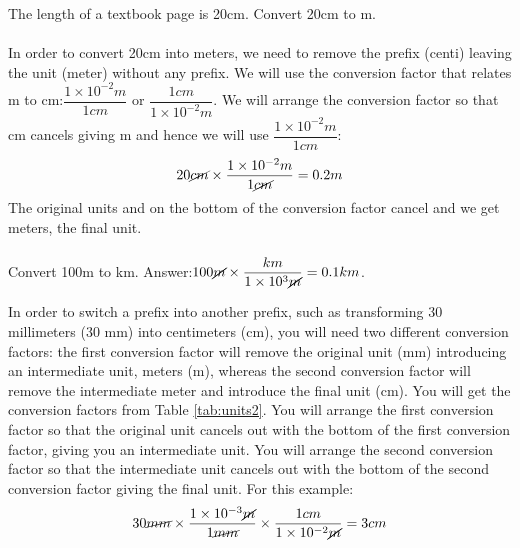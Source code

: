\documentclass[main.tex]{subfiles}
\begin{document}
\begin{description}
\begin{example} %
The length of a textbook page is 20cm. Convert 20cm to m.\\
\\
In order to convert 20cm into meters, we need to remove the prefix (centi) leaving the unit (meter) without any prefix. We will use the conversion factor that relates m to cm:$\dfrac{1\times10^{-2}m}{1cm}$ or $\dfrac{1cm}{1\times10^{-2}m}$. We will arrange the conversion factor so that cm cancels giving m and hence we will use $\dfrac{1\times10^{-2}m}{1cm}$:
 \begin{equation*}
20\cancel{cm} \times \dfrac{1\times10^{-2}m}{1\cancel{cm}}=0.2m
\end{equation*}
The original units and on the bottom of the conversion factor cancel and we get meters, the final unit.
\\
\faDiamond\ \\
Convert 100m to km.
\flushright Answer:$100\cancel{m} \times \dfrac{km}{1\times10^{3}\cancel{m}}=0.1km$.
\end{example}%


\item[\docfilehook{Switching prefixes}{Switching prefixes}] In order to switch a prefix into another prefix, such as transforming 30 millimeters (30 mm) into centimeters (cm), you will need two different conversion factors: the first conversion factor will remove the original unit (mm) introducing an intermediate unit, meters (m), whereas the second conversion factor will remove the intermediate meter and introduce the final unit (cm). You will get the conversion factors from Table \ref{tab:units2}. You will arrange the first conversion factor so that the original unit cancels out with the bottom of the first conversion factor, giving you an intermediate unit. You will arrange the second conversion factor so that the intermediate unit cancels out with the bottom of the second conversion factor giving the final unit. For this example:
 \begin{equation*}
30\cancel{mm} \times \dfrac{1\times10^{-3}\cancel{m}}{1\cancel{mm}}   \times \dfrac{1cm}{1\times10^{-2}\cancel{m}}       =3cm
\end{equation*}


\end{description}
\end{document}
